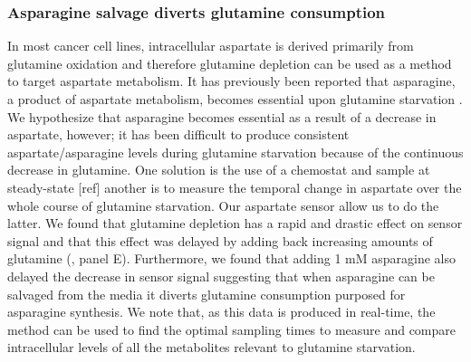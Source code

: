 \documentclass[9pt,lineno]{elife}
\begin{document}
\subsubsection{Asparagine salvage diverts glutamine consumption}
In most cancer cell lines, intracellular aspartate is derived primarily from glutamine oxidation and therefore glutamine depletion can be used as a method to target aspartate metabolism.
It has previously been reported that asparagine, a product of aspartate metabolism, becomes essential upon glutamine starvation \citep{Pavlova2018-nl}.
We hypothesize that asparagine becomes essential as a result of a decrease in aspartate, however; it has been difficult to produce consistent aspartate/asparagine levels during glutamine starvation because of the continuous decrease in glutamine.
One solution is the use of a chemostat and sample at steady-state [ref] another is to measure the temporal change in aspartate over the whole course of glutamine starvation.
Our aspartate sensor allow us to do the latter.
We found that glutamine depletion has a rapid and drastic effect on sensor signal and that this effect was delayed by adding back increasing amounts of glutamine (, panel E).
Furthermore, we found that adding 1 mM asparagine also delayed the decrease in sensor signal suggesting that when asparagine can be salvaged from the media it diverts glutamine consumption purposed for asparagine synthesis.
We note that, as this data is produced in real-time, the method can be used to find the optimal sampling times to measure and compare intracellular levels of all the metabolites relevant to glutamine starvation.
\end{document}
